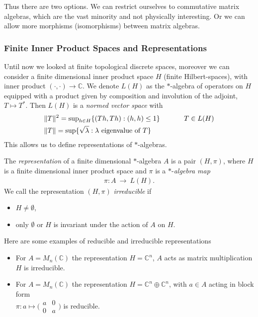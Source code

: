 Thus there are two options. We can restrict ourselves to commutative matrix algebras,
which are the vast minority and not physically interesting.
Or we can allow more morphisms (isomorphisms) between matrix algebras.

\subsubsection{Finite Inner Product Spaces and Representations}
Until now we looked at finite topological discrete spaces, moreover we can consider a
finite dimensional inner product space $H$ (finite Hilbert-spaces), with inner product
$(\cdot,\cdot)\rightarrow \mathbb{C}$. We denote $L(H)$ as  the $*$-algebra of operators on $H$
equipped with a product given by composition and involution of the adjoint, $T \mapsto T^*$.
Then $L(H)$ is a \textit{normed vector space} with
\begin{align}
    &\|T\|^2 = \text{sup}_{h \in H}\{(Th,Th): (h,h) \leq 1\} \hspace{0.1\textwidth} T \in L(H) \\
    &\|T\| = \text{sup}\{\sqrt{\lambda}: \lambda \text{ eigenvalue of } T\}
\end{align}
This allows us to define representations of $*$-algebras.
\begin{definition}
    The \textit{representation} of a finite dimensional $*$-algebra $A$ is a
    pair $(H, \pi)$, where $H$ is a finite dimensional inner product space
    and $\pi$ is a $*$-\textit{algebra map}
    \begin{align}
        \pi:A\ \rightarrow \ L(H).
    \end{align}
    We call the representation $(H, \pi)$ \textit{irreducible} if
    \begin{itemize}
        \item $H \neq \emptyset$,
        \item only $\emptyset$ or $H$ is invariant under the action of $A$ on
            $H$.
    \end{itemize}
\end{definition}
Here are some examples of reducible and irreducible representations
\begin{itemize}
    \item For $A = M_n(\mathbb{C})$ the representation $H=\mathbb{C}^n$, $A$ acts as matrix multiplication\\
            $H$ is irreducible.
    \item For $A = M_n(\mathbb{C})$ the representation $H=\mathbb{C}^n\oplus \mathbb{C}^n$, with $a \in A$ acting
        in block form \\ $\pi: a \mapsto \big(\begin{smallmatrix} a & 0\\ 0 & a \end{smallmatrix}\big)$ is
            reducible.
\end{itemize}
